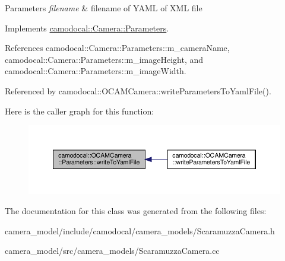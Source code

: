 \begin{DoxyParams}{Parameters}
{\em filename} & filename of Y\+A\+ML of X\+ML file \\
\hline
\end{DoxyParams}


Implements \hyperlink{classcamodocal_1_1Camera_1_1Parameters_a7da3e505d5b047c7bfa3cf94d6c97710}{camodocal\+::\+Camera\+::\+Parameters}.



References camodocal\+::\+Camera\+::\+Parameters\+::m\+\_\+camera\+Name, camodocal\+::\+Camera\+::\+Parameters\+::m\+\_\+image\+Height, and camodocal\+::\+Camera\+::\+Parameters\+::m\+\_\+image\+Width.



Referenced by camodocal\+::\+O\+C\+A\+M\+Camera\+::write\+Parameters\+To\+Yaml\+File().

Here is the caller graph for this function\+:\nopagebreak
\begin{figure}[H]
\begin{center}
\leavevmode
\includegraphics[width=350pt]{classcamodocal_1_1OCAMCamera_1_1Parameters_a3244c89711d0195540042c3700992827_icgraph}
\end{center}
\end{figure}


The documentation for this class was generated from the following files\+:\begin{DoxyCompactItemize}
\item 
camera\+\_\+model/include/camodocal/camera\+\_\+models/Scaramuzza\+Camera.\+h\item 
camera\+\_\+model/src/camera\+\_\+models/Scaramuzza\+Camera.\+cc\end{DoxyCompactItemize}
